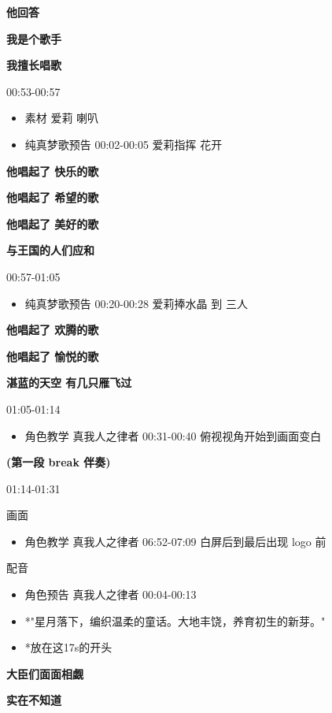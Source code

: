 \documentclass[a4paper]{article}
\begin{document}
\textbf{他回答}

\textbf{我是个歌手}

\textbf{我擅长唱歌}

00:53-00:57

\begin{itemize}
    \item 素材 爱莉 喇叭
    \item 纯真梦歌预告 00:02-00:05 爱莉指挥 花开
\end{itemize}

\textbf{他唱起了 快乐的歌}

\textbf{他唱起了 希望的歌}

\textbf{他唱起了 美好的歌}

\textbf{与王国的人们应和}

00:57-01:05

\begin{itemize}
    \item 纯真梦歌预告 00:20-00:28 爱莉捧水晶 到 三人
\end{itemize}

\textbf{他唱起了 欢腾的歌}

\textbf{他唱起了 愉悦的歌}

\textbf{湛蓝的天空 有几只雁飞过}

01:05-01:14

\begin{itemize}
    \item 角色教学 真我人之律者 00:31-00:40 俯视视角开始到画面变白
\end{itemize}

\textbf{(第一段 break 伴奏)}

01:14-01:31

画面

\begin{itemize}
    \item 角色教学 真我人之律者 06:52-07:09 白屏后到最后出现 logo 前
\end{itemize}

配音

\begin{itemize}
    \item 角色预告 真我人之律者 00:04-00:13
    \item *"星月落下，编织温柔的童话。大地丰饶，养育初生的新芽。"
    \item *放在这17s的开头
\end{itemize}

\textbf{大臣们面面相觑}

\textbf{实在不知道}
\end{document}
